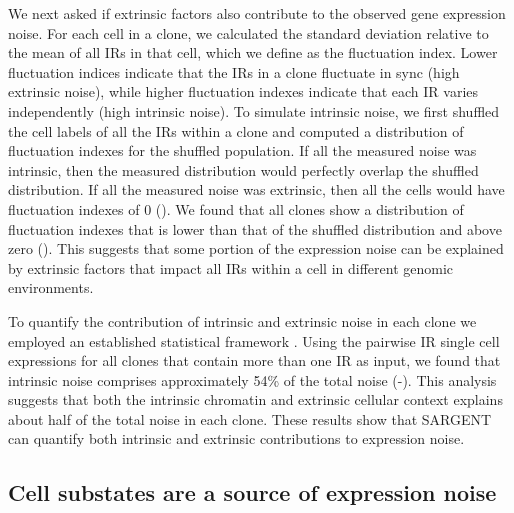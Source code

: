 We next asked if extrinsic factors also contribute to the observed gene expression noise. For each cell in a clone, we calculated the standard deviation relative to the mean of all IRs in that cell, which we define as the fluctuation index. Lower fluctuation indices indicate that the IRs in a clone fluctuate in sync (high extrinsic noise), while higher fluctuation indexes indicate that each IR varies independently (high intrinsic noise). To simulate intrinsic noise, we first shuffled the cell labels of all the IRs within a clone and computed a distribution of fluctuation indexes for the shuffled population. If all the measured noise was intrinsic, then the measured distribution would perfectly overlap the shuffled distribution. If all the measured noise was extrinsic, then all the cells would have fluctuation indexes of 0 (). We found that all clones show a distribution of fluctuation indexes that is lower than that of the shuffled distribution and above zero (). This suggests that some portion of the expression noise can be explained by extrinsic factors that impact all IRs within a cell in different genomic environments.

To quantify the contribution of intrinsic and extrinsic noise in each clone we employed an established statistical framework \cite{fuaq_pachterl:EstimatingIntrinsic2016}. Using the pairwise IR single cell expressions for all clones that contain more than one IR as input, we found that intrinsic noise comprises approximately 54\% of the total noise (-). This analysis suggests that both the intrinsic chromatin and extrinsic cellular context explains about half of the total noise in each clone. These results show that SARGENT can quantify both intrinsic and extrinsic contributions to expression noise.

\subsection{Cell substates are a source of expression noise}

